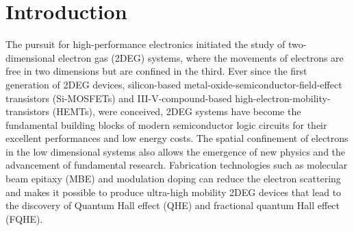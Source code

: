 \documentclass[pdflatex, sectionletters, 12pt]{pittetd}    %
\begin{document}

%
%
\chapter{Introduction}%
\label{SEC:introduction}

The pursuit for high-performance electronics initiated the study of two-dimensional electron gas (2DEG) systems, where the movements of electrons are free in two dimensions but are confined in the third. Ever since the first generation of 2DEG devices, silicon-based metal-oxide-semiconductor-field-effect transistors (Si-MOSFETs) and III-V-compound-based high-electron-mobility-transistors (HEMTs), were conceived, 2DEG systems have become the fundamental building blocks of modern semiconductor logic circuits for their excellent performances and low energy costs\cite{vinet2017cmos}. The spatial confinement of electrons in the low dimensional systems also allows the emergence of new physics and the advancement of fundamental research. Fabrication technologies such as molecular beam epitaxy (MBE) and modulation doping\cite{dingle1979high} can reduce the electron scattering and makes it possible to produce ultra-high mobility 2DEG devices that lead to the discovery of Quantum Hall effect (QHE)\cite{klitzing1980new} and fractional quantum Hall effect (FQHE)\cite{chang1983fractional}.
\end{document}
